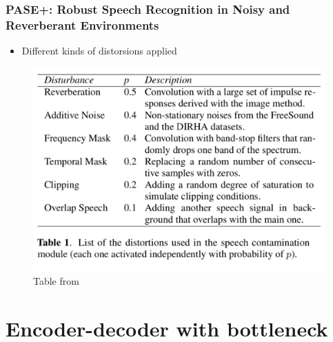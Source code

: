 \documentclass[table]{beamer}
\begin{document}
\begin{frame}
\frametitle{PASE+:  Robust Speech Recognition in Noisy and Reverberant Environments}

		\begin{itemize}
			\item Different kinds of distorsions applied
		\end{itemize} 


		\begin{figure}
			\centering
			\includegraphics[scale=0.35]	{distorsions} 
			\caption{Table from \citep{ravanelli2020multitask}}
			\end{figure}

\end{frame}


\section{Encoder-decoder with bottleneck}
\end{document}
